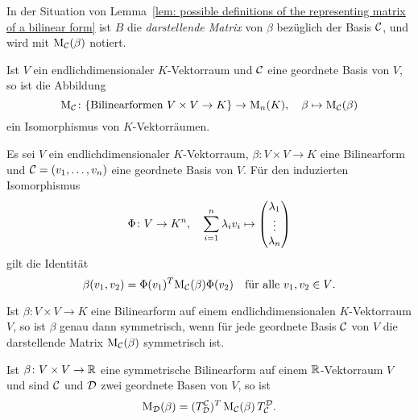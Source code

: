 \begin{definition}
  In der Situation von Lemma~\ref{lem: possible definitions of the representing matrix of a bilinear form} ist $B$ die \emph{darstellende Matrix} von $\beta$ bezüglich der Basis $\mathcal{C}$, und wird mit $\mathrm{M}_{\mathcal{C}}(\beta)$ notiert.
\end{definition}


\begin{lemma}
  Ist $V$ ein endlichdimensionaler $K$-Vektorraum und $\mathcal{C}$ eine geordnete Basis von $V$, so ist die Abbildung
  \[
    \mathrm{M}_{\mathcal{C}}
    \colon
    \{\text{Bilinearformen $V \times V \to K$}\}
    \to
    \mathrm{M}_n(K),
    \quad
    \beta
    \mapsto
    \mathrm{M}_{\mathcal{C}}(\beta)
  \]
  ein Isomorphismus von $K$-Vektorräumen.
\end{lemma}


\begin{lemma}
  Es sei $V$ ein endlichdimensionaler $K$-Vektorraum, $\beta \colon V \times V \to K$ eine Bilinearform und $\mathcal{C} = (v_1, \dotsc, v_n)$ eine geordnete Basis von $V$.
  Für den induzierten Isomorphismus
  \[
    \Phi \colon V \to K^n,
    \quad
    \sum_{i=1}^n \lambda_i v_i \mapsto \begin{pmatrix} \lambda_1 \\ \vdots \\ \lambda_n \end{pmatrix}
  \]
  gilt die Identität
  \[
    \beta(v_1, v_2)
    =
    \Phi(v_1)^T \mathrm{M}_{\mathcal{C}}(\beta) \Phi(v_2)
    \quad
    \text{für alle $v_1, v_2 \in V$}.
  \]
\end{lemma}


\begin{corollary}
  Ist $\beta \colon V \times V \to K$ eine Bilinearform auf einem endlichdimensionalen $K$-Vektorraum $V$, so ist $\beta$ genau dann symmetrisch, wenn für jede geordnete Basis $\mathcal{C}$ von $V$ die darstellende Matrix $\mathrm{M}_{\mathcal{C}}(\beta)$ symmetrisch ist.
\end{corollary}


\begin{lemma}
  Ist $\beta \colon V \times V \to \mathbb{R}$ eine symmetrische Bilinearform auf einem $\mathbb{R}$-Vektorraum $V$ und sind $\mathcal{C}$ und $\mathcal{D}$ zwei geordnete Basen von $V$, so ist
  \[
      \mathrm{M}_{\mathcal{D}}(\beta)
    = (T^{\mathcal{C}}_{\mathcal{D}})^T \, \mathrm{M}_{\mathcal{C}}(\beta) \, T^{\mathcal{D}}_{\mathcal{C}}.
  \]
\end{lemma}











